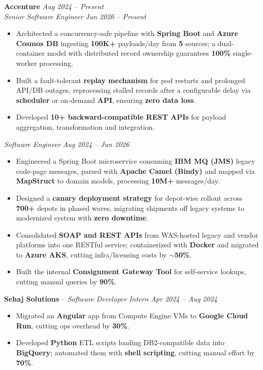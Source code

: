 \documentclass[10pt]{article}
\begin{document}
\textbf{Accenture} \hfill \textit{Aug 2024 -- Present} \\[1pt]
\vspace{3pt}
\textit{Senior Software Engineer} \hfill \textit{Jun 2026 -- Present}
\vspace{3pt}
\begin{itemize}
    \item Architected a concurrency-safe pipeline with \textbf{Spring Boot} and \textbf{Azure Cosmos DB} ingesting \textbf{100K+} payloads/day from \textbf{5} sources; a dual-container model with distributed record ownership guarantees \textbf{100\%} single-worker processing.
    \item Built a fault-tolerant \textbf{replay mechanism} for pod restarts and prolonged API/DB outages, reprocessing stalled records after a configurable delay via \textbf{scheduler} or on-demand \textbf{API}, ensuring \textbf{zero data loss}.
    \item Developed \textbf{10+ backward-compatible REST APIs} for payload aggregation, transformation and integration.
\end{itemize}
\vspace{5pt}
\textit{Software Engineer} \hfill \textit{Aug 2024 -- Jun 2026}
\vspace{3pt}
\begin{itemize}
    \item Engineered a Spring Boot microservice consuming \textbf{IBM MQ (JMS)} legacy code-page messages, parsed with \textbf{Apache Camel (Bindy)} and mapped via \textbf{MapStruct} to domain models, processing \textbf{10M+} messages/day.
    \item Designed a \textbf{canary deployment strategy} for depot-wise rollout across \textbf{700+} depots in phased waves, migrating shipments off legacy systems to modernized system with \textbf{zero downtime}.
    \item Consolidated \textbf{SOAP and REST APIs} from WAS-hosted legacy and vendor platforms into one RESTful service; containerized with \textbf{Docker} and migrated to \textbf{Azure AKS}, cutting infra/licensing costs by \textbf{\(\sim\)50\%}.
    \item Built the internal \textbf{Consignment Gateway Tool} for self-service lookups, cutting manual queries by \textbf{90\%}.
\end{itemize}
\vspace{5pt}
\textbf{Sehaj Solutions} -- \textit{Software Developer Intern} \hfill \textit{Apr 2024 -- Aug 2024}
\vspace{3pt}
\begin{itemize}
    \item Migrated an \textbf{Angular} app from Compute Engine VMs to \textbf{Google Cloud Run}, cutting ops overhead by \textbf{30\%}.
    \item Developed \textbf{Python} ETL scripts loading DB2-compatible data into \textbf{BigQuery}; automated them with \textbf{shell scripting}, cutting manual effort by \textbf{70\%}.
\end{itemize}
\end{document}
